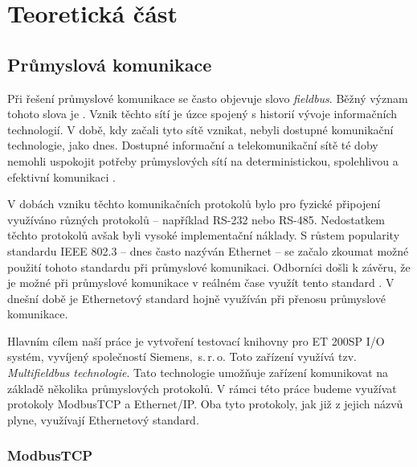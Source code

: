 \chapter{Teoretická část} %

\section{Průmyslová komunikace}

Při řešení průmyslové komunikace se často objevuje slovo \textit{fieldbus}. Běžný význam tohoto slova je  \cite{fieldbus_thomesse}. Vznik těchto sítí je úzce spojený s historií vývoje informačních technologií. V době, kdy začali tyto sítě vznikat, nebyli dostupné komunikační technologie, jako dnes. Dostupné informační a telekomunikační sítě té doby nemohli uspokojit potřeby průmyslových sítí na deterministickou, spolehlivou a efektivní komunikaci \cite{future_of_ind_com}. 

V dobách vzniku těchto komunikačních protokolů bylo pro fyzické připojení využíváno různých protokolů -- například RS-232 nebo RS-485. Nedostatkem těchto protokolů avšak byli vysoké implementační náklady. S růstem popularity standardu IEEE 802.3 -- dnes často nazýván Ethernet -- se začalo zkoumat možné použití tohoto standardu při průmyslové komunikaci. Odborníci došli k závěru, že je možné při průmyslové komunikace v reálném čase využít tento standard \cite{lee_ethernet_fieldbus}. V dnešní době je Ethernetový standard hojně využíván při přenosu průmyslové komunikace.

Hlavním cílem naší práce je vytvoření testovací knihovny pro ET 200SP I/O systém, vyvíjený společností Siemens,~s.\,{}r.\,{}o. Toto zařízení využívá tzv. \textit{Multifieldbus technologie}. Tato technologie umožňuje zařízení komunikovat na základě několika průmyslových protokolů. V rámci této práce budeme využívat protokoly ModbusTCP a Ethernet/IP. Oba tyto protokoly, jak již z jejich názvů plyne, využívají Ethernetový standard.  


\subsection{ModbusTCP}

